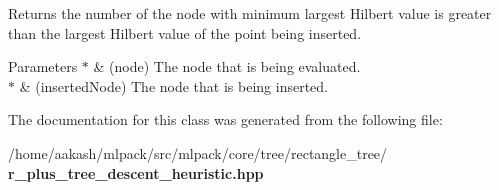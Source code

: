 Returns the number of the node with minimum largest Hilbert value is greater than the largest Hilbert value of the point being inserted.


\begin{DoxyParams}{Parameters}
{\em $\ast$} & (node) The node that is being evaluated. \\
\hline
{\em $\ast$} & (inserted\+Node) The node that is being inserted. \\
\hline
\end{DoxyParams}


The documentation for this class was generated from the following file\+:\begin{DoxyCompactItemize}
\item 
/home/aakash/mlpack/src/mlpack/core/tree/rectangle\+\_\+tree/\textbf{ r\+\_\+plus\+\_\+tree\+\_\+descent\+\_\+heuristic.\+hpp}\end{DoxyCompactItemize}

